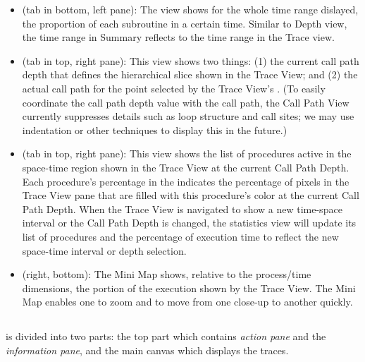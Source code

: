 \begin{itemize}
\item \textbf{\summaryview} (tab in bottom, left pane):
  The view shows for the whole time range dislayed, the proportion of each subroutine in a certain time.
  Similar to Depth view, the time range in Summary reflects to the time range in the Trace view. 

\item \textbf{\callview} (tab in top, right pane):
  This view shows two things: (1) the current call path depth that defines the hierarchical slice shown in the Trace View; and (2) the actual call path for the point selected by the Trace View's \crosshair{}.
  (To easily coordinate the call path depth value with the call path, the Call Path View currently suppresses details such as loop structure and call sites; we may use indentation or other techniques to display this in the future.)

\item \textbf{\statview} (tab in top, right pane):
  This view shows the list of procedures active  in the  space-time region shown in the Trace View at the current Call Path Depth. Each procedure's percentage in the \statview{} indicates the percentage of pixels in the Trace View pane that are filled with this procedure's color at the current Call Path Depth. When the Trace View is navigated to show a new time-space interval  or the Call Path Depth is  changed, the statistics view will  update its list of procedures and the percentage of execution time to reflect the new space-time interval or depth selection.
 

\item \textbf{\miniview} (right, bottom):
  The Mini Map shows, relative to the process/time dimensions, the portion of the execution shown by the Trace View.
  The Mini Map enables one to zoom and to move from one close-up to another quickly.

\end{itemize}


\subsection{\traceview}
\label{sec:traceview}

\traceview{} is divided into two parts: the top part which contains \emph{action pane} and the \emph{information pane}, and the main canvas which displays the traces. 


